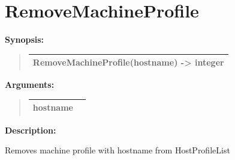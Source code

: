 \documentclass[letterpaper,10pt,english]{sphinxmanual}
\begin{document}
\section{RemoveMachineProfile}
\label{functions:removemachineprofile}
\begin{DUlineblock}{0em}
\item[] \textbf{Synopsis:}
\end{DUlineblock}
\begin{quote}

\begin{tabulary}{\linewidth}{|L|}
\hline

RemoveMachineProfile(hostname) -\textgreater{} integer
\\
\hline\end{tabulary}

\end{quote}

\begin{DUlineblock}{0em}
\item[] 
\item[] \textbf{Arguments:}
\end{DUlineblock}
\begin{quote}

\begin{tabulary}{\linewidth}{|L|L|}
\hline

hostname
 & \\
\hline\end{tabulary}

\end{quote}

\begin{DUlineblock}{0em}
\item[] 
\item[] \textbf{Description:}
\item[] Removes machine profile with hostname from HostProfileList
\end{DUlineblock}

\begin{DUlineblock}{0em}
\item[] 
\end{DUlineblock}
\end{document}

